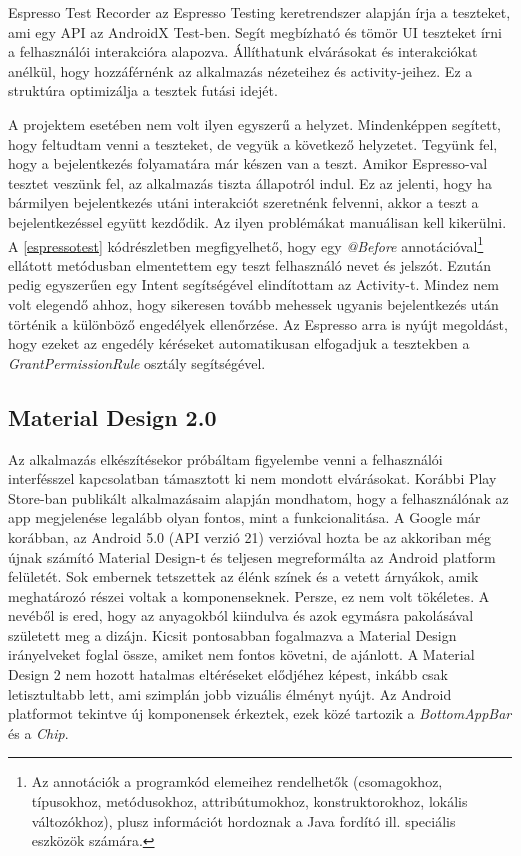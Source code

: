 \documentclass{thesis-ekf}
\theoremstyle{definition}
\theoremstyle{remark}
\begin{document}
Espresso Test Recorder az Espresso Testing keretrendszer alapján írja a teszteket, ami egy API az AndroidX Test-ben.
Segít megbízható és tömör UI teszteket írni a felhasználói interakcióra alapozva.
Állíthatunk elvárásokat és interakciókat anélkül, hogy hozzáférnénk az alkalmazás nézeteihez és activity-jeihez.
Ez a struktúra optimizálja a tesztek futási idejét. \cite{espresso}

A projektem esetében nem volt ilyen egyszerű a helyzet.
Mindenképpen segített, hogy feltudtam venni a teszteket, de vegyük a következő helyzetet.
Tegyünk fel, hogy a bejelentkezés folyamatára már készen van a teszt.
Amikor Espresso-val tesztet veszünk fel, az alkalmazás tiszta állapotról indul.
Ez az jelenti, hogy ha bármilyen bejelentkezés utáni interakciót szeretnénk felvenni, akkor a teszt a bejelentkezéssel együtt kezdődik.
Az ilyen problémákat manuálisan kell kikerülni.
A \ref{espressotest} kódrészletben megfigyelhető, hogy egy \emph{@Before} annotációval\footnote{Az annotációk a programkód elemeihez rendelhetők (csomagokhoz, típusokhoz, metódusokhoz, attribútumokhoz, konstruktorokhoz, lokális változókhoz), plusz információt hordoznak a Java fordító ill. speciális eszközök számára.\cite{annotaciok}} ellátott metódusban elmentettem egy teszt felhasználó nevet és jelszót.
Ezután pedig egyszerűen egy Intent segítségével elindítottam az Activity-t.
Mindez nem volt elegendő ahhoz, hogy sikeresen tovább mehessek ugyanis bejelentkezés után történik a különböző engedélyek ellenőrzése.
Az Espresso arra is nyújt megoldást, hogy ezeket az engedély kéréseket automatikusan elfogadjuk a tesztekben a \emph{GrantPermissionRule} osztály segítségével.



\subsection{Material Design 2.0}

Az alkalmazás elkészítésekor próbáltam figyelembe venni a felhasználói interfésszel kapcsolatban támasztott ki nem mondott elvárásokat.
Korábbi Play Store-ban publikált alkalmazásaim alapján mondhatom, hogy a felhasználónak az app megjelenése legalább olyan fontos, mint a funkcionalitása.
A Google már korábban, az Android 5.0 (API verzió 21) verzióval hozta be az akkoriban még újnak számító Material Design-t és teljesen megreformálta az Android platform felületét.
Sok embernek tetszettek az élénk színek és a vetett árnyákok, amik meghatározó részei voltak a komponenseknek. Persze, ez nem volt tökéletes.
A nevéből is ered, hogy az anyagokból kiindulva és azok egymásra pakolásával született meg a dizájn. 
Kicsit pontosabban fogalmazva a Material Design irányelveket foglal össze, amiket nem fontos követni, de ajánlott. 
A Material Design 2 nem hozott hatalmas eltéréseket elődjéhez képest, inkább csak letisztultabb lett, ami szimplán jobb vizuális élményt nyújt.
Az Android platformot tekintve új komponensek érkeztek, ezek közé tartozik a \emph{BottomAppBar} és a \emph{Chip}.
\end{document}
